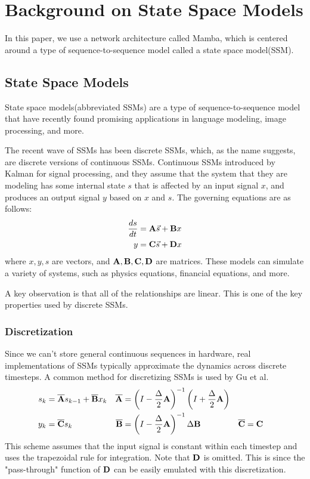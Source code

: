 
\section{Background on State Space Models}
In this paper, we use a network architecture called Mamba, which is centered
around a type of sequence-to-sequence model called a state space model(SSM).

\subsection{State Space Models}
State space models(abbreviated SSMs) are a type of sequence-to-sequence model
that have recently found promising applications in language
modeling\cite{mamba}, image processing\cite{medmamba}, and more\cite{s4}.

The recent wave of SSMs has been discrete SSMs, which, as the name suggests, are
discrete versions of continuous SSMs.
Continuous SSMs introduced by Kalman\cite{kalman} for signal processing, and
they assume that the system that they are modeling has some internal state $s$
that is affected by an input signal $x$, and produces an output signal $y$ based
on $x$ and $s$.
The governing equations are as follows:
$$\begin{aligned}
    \frac{ds}{dt} &= {\mathbf{A}}\vec{s} + {\mathbf{B}} x \\
    y &= {\mathbf{C}}\vec{s} + {\mathbf{D}} x
\end{aligned}$$
where $x, y, s$ are vectors, and ${\mathbf{A}}, {\mathbf{B}}, {\mathbf{C}}, {\mathbf{D}}$ are matrices.
These models can simulate a variety of systems, such as physics equations,
financial equations, and more.

A key observation is that all of the relationships are linear. This is one of
the key properties used by discrete SSMs.

\subsubsection{Discretization}
Since we can't store general continuous sequences in hardware, real
implementations of SSMs typically approximate the dynamics across discrete
timesteps.
A common method for discretizing SSMs is used by Gu et al. \cite{s4}
$$\begin{aligned}
    s_k &= \overline {{\mathbf{A}}} s_{k-1} + \overline {{\mathbf{B}}} x_k
    &
    \overline {{\mathbf{A}}} &=
    \left(I - \frac{\Delta}{2}{\mathbf{A}}\right)^{-1}
    \left(I + \frac{\Delta}{2}{\mathbf{A}}\right)
    \\
    y_k &= \overline {{\mathbf{C}}} s_k
    &
    \overline {{\mathbf{B}}} &=
    \left(I - \frac{\Delta}{2}{\mathbf{A}}\right)^{-1}
    \Delta {\mathbf{B}}
    &
    \overline {{\mathbf{C}}} &= {\mathbf{C}}
\end{aligned}$$
This scheme assumes that the input signal is constant within each timestep and
uses the trapezoidal rule for integration.
Note that ${\mathbf{D}}$ is omitted. This is since the "pass-through" function of ${\mathbf{D}}$
can be easily emulated with this discretization.

